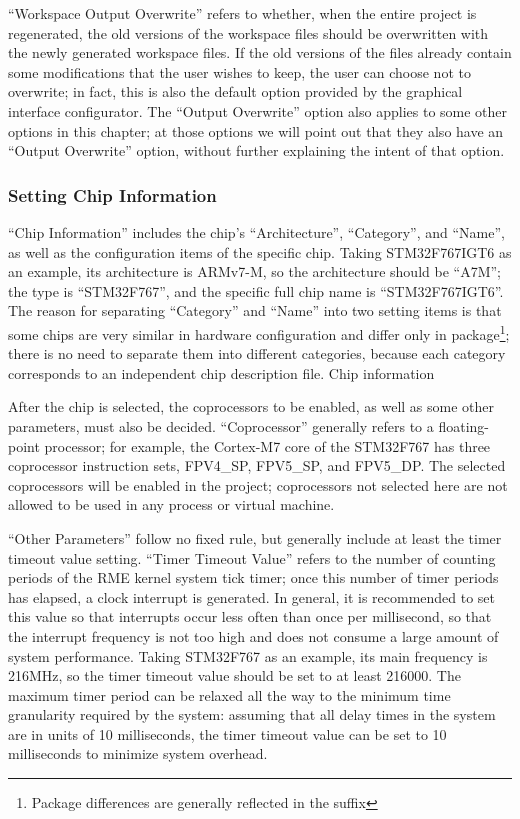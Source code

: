 ``Workspace Output Overwrite'' refers to whether, when the entire project is regenerated, the old versions of the workspace files should be overwritten with the newly generated workspace files. If the old versions of the files already contain some modifications that the user wishes to keep, the user can choose not to overwrite; in fact, this is also the default option provided by the graphical interface configurator. The ``Output Overwrite'' option also applies to some other options in this chapter; at those options we will point out that they also have an ``Output Overwrite'' option, without further explaining the intent of that option.

\subsubsection{Setting Chip Information}\label{subsubsec:6-5-1-3}

``Chip Information'' includes the chip's ``Architecture'', ``Category'', and ``Name'', as well as the configuration items of the specific chip. Taking STM32F767IGT6 as an example, its architecture is ARMv7-M, so the architecture should be ``A7M''; the type is ``STM32F767'', and the specific full chip name is ``STM32F767IGT6''. The reason for separating ``Category'' and ``Name'' into two setting items is that some chips are very similar in hardware configuration and differ only in package\footnote{Package differences are generally reflected in the suffix}; there is no need to separate them into different categories, because each category corresponds to an independent chip description file. Chip information

After the chip is selected, the coprocessors to be enabled, as well as some other parameters, must also be decided. ``Coprocessor'' generally refers to a floating-point processor; for example, the Cortex-M7 core of the STM32F767 has three coprocessor instruction sets, FPV4\_SP, FPV5\_SP, and FPV5\_DP. The selected coprocessors will be enabled in the project; coprocessors not selected here are not allowed to be used in any process or virtual machine.

``Other Parameters'' follow no fixed rule, but generally include at least the timer timeout value setting. ``Timer Timeout Value'' refers to the number of counting periods of the RME kernel system tick timer; once this number of timer periods has elapsed, a clock interrupt is generated. In general, it is recommended to set this value so that interrupts occur less often than once per millisecond, so that the interrupt frequency is not too high and does not consume a large amount of system performance. Taking STM32F767 as an example, its main frequency is 216MHz, so the timer timeout value should be set to at least 216000. The maximum timer period can be relaxed all the way to the minimum time granularity required by the system: assuming that all delay times in the system are in units of 10 milliseconds, the timer timeout value can be set to 10 milliseconds to minimize system overhead.

